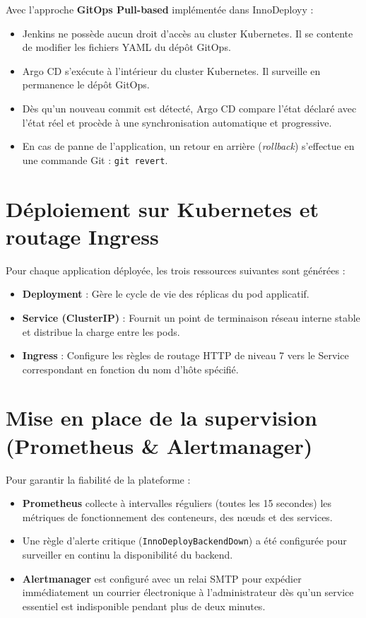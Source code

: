 \documentclass[12pt,a4paper,oneside]{report}
\begin{document}
Avec l'approche \textbf{GitOps Pull-based} implémentée dans InnoDeployy :
\begin{itemize}[label=$\bullet$]
    \item Jenkins ne possède aucun droit d'accès au cluster Kubernetes. Il se contente de modifier les fichiers YAML du dépôt GitOps.
    \item Argo CD s'exécute à l'intérieur du cluster Kubernetes. Il surveille en permanence le dépôt GitOps.
    \item Dès qu'un nouveau commit est détecté, Argo CD compare l'état déclaré avec l'état réel et procède à une synchronisation automatique et progressive.
    \item En cas de panne de l'application, un retour en arrière (\textit{rollback}) s'effectue en une commande Git : \texttt{git revert}.
\end{itemize}

\section{Déploiement sur Kubernetes et routage Ingress}
Pour chaque application déployée, les trois ressources suivantes sont générées :
\begin{itemize}
    \item \textbf{Deployment} : Gère le cycle de vie des réplicas du pod applicatif.
    \item \textbf{Service (ClusterIP)} : Fournit un point de terminaison réseau interne stable et distribue la charge entre les pods.
    \item \textbf{Ingress} : Configure les règles de routage HTTP de niveau 7 vers le Service correspondant en fonction du nom d'hôte spécifié.
\end{itemize}

\section{Mise en place de la supervision (Prometheus & Alertmanager)}
Pour garantir la fiabilité de la plateforme :
\begin{itemize}[label=$\bullet$]
    \item \textbf{Prometheus} collecte à intervalles réguliers (toutes les 15 secondes) les métriques de fonctionnement des conteneurs, des nœuds et des services.
    \item Une règle d'alerte critique (\texttt{InnoDeployBackendDown}) a été configurée pour surveiller en continu la disponibilité du backend.
    \item \textbf{Alertmanager} est configuré avec un relai SMTP pour expédier immédiatement un courrier électronique à l'administrateur dès qu'un service essentiel est indisponible pendant plus de deux minutes.
\end{itemize}
\end{document}
